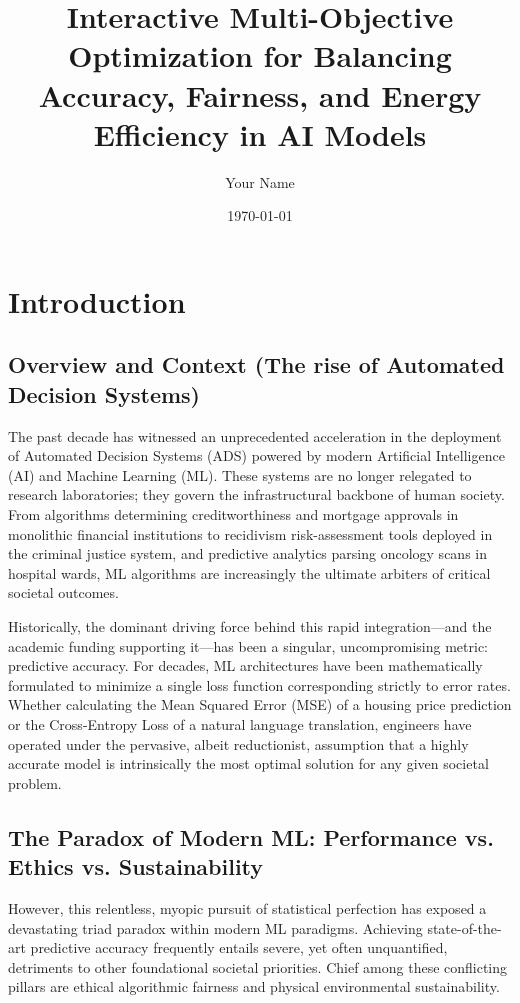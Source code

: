 \documentclass[12pt,a4paper]{article}
\title{Interactive Multi-Objective Optimization for Balancing Accuracy, Fairness, and Energy Efficiency in AI Models}
\author{Your Name}
\date{\today}
\begin{document}
\maketitle
\tableofcontents
\newpage

\section{Introduction}

\subsection{Overview and Context (The rise of Automated Decision Systems)}
The past decade has witnessed an unprecedented acceleration in the deployment of Automated Decision Systems (ADS) powered by modern Artificial Intelligence (AI) and Machine Learning (ML). These systems are no longer relegated to research laboratories; they govern the infrastructural backbone of human society. From algorithms determining creditworthiness and mortgage approvals in monolithic financial institutions to recidivism risk-assessment tools deployed in the criminal justice system, and predictive analytics parsing oncology scans in hospital wards, ML algorithms are increasingly the ultimate arbiters of critical societal outcomes. 

Historically, the dominant driving force behind this rapid integration—and the academic funding supporting it—has been a singular, uncompromising metric: predictive accuracy. For decades, ML architectures have been mathematically formulated to minimize a single loss function corresponding strictly to error rates. Whether calculating the Mean Squared Error (MSE) of a housing price prediction or the Cross-Entropy Loss of a natural language translation, engineers have operated under the pervasive, albeit reductionist, assumption that a highly accurate model is intrinsically the most optimal solution for any given societal problem.

\subsection{The Paradox of Modern ML: Performance vs. Ethics vs. Sustainability}
However, this relentless, myopic pursuit of statistical perfection has exposed a devastating triad paradox within modern ML paradigms. Achieving state-of-the-art predictive accuracy frequently entails severe, yet often unquantified, detriments to other foundational societal priorities. Chief among these conflicting pillars are ethical algorithmic fairness and physical environmental sustainability.
\end{document}
